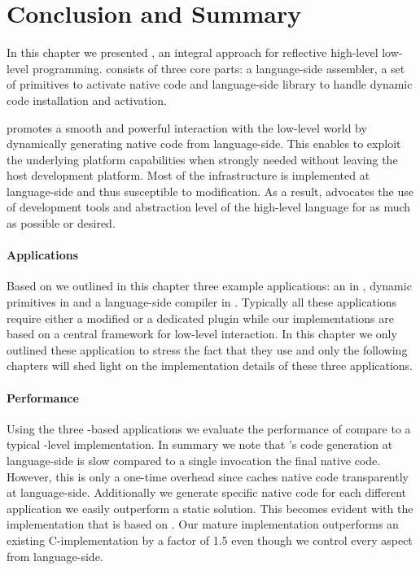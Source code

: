 \section{Conclusion and Summary}

In this chapter we presented \B, an integral approach for reflective high-level low-level programming.
\B consists of three core parts: \AsmJIT a language-side assembler, a set of primitives to activate native code and language-side library to handle dynamic code installation and activation.

\B promotes a smooth and powerful interaction with the low-level world by dynamically generating native code from language-side.
This enables to exploit the underlying platform capabilities when strongly needed without leaving the host development platform.
Most of the \B infrastructure is implemented at language-side and thus susceptible to modification. 
As a result, \B advocates the use of development tools and abstraction level of the high-level language for as much as possible or desired.

\paragraph{\B Applications}
Based on \B we outlined in this chapter three example applications: an \FFI in , dynamic primitives in  and a language-side \JIT compiler in .
Typically all these applications require either a modified \VM or a dedicated plugin while our implementations are based on a central framework for low-level interaction.
In this chapter we only outlined these application to stress the fact that they use \B and only the following chapters will shed light on the implementation details of these three applications.

\paragraph{\B Performance}
Using the three \B-based applications we evaluate the performance of \B compare to a typical \VM-level implementation.
In summary we note that \B's code generation at language-side is slow compared to a single invocation the final native code.
However, this is only a one-time overhead since \B caches native code transparently at language-side.
Additionally we generate specific native code for each different application we easily outperform a static solution.
This becomes evident with the \FFI implementation that is based on \B.
Our mature \FFI implementation outperforms an existing C-\FFI implementation by a factor of 1.5 even though we control every aspect from language-side.

